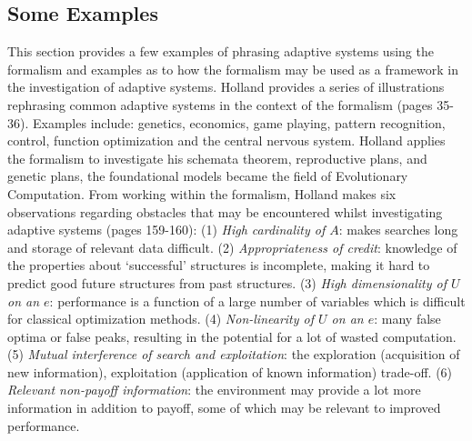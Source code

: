 \documentclass[a4paper, 11pt]{article}
\begin{document}
\subsection{Some Examples}
This section provides a few examples of phrasing adaptive systems using the formalism and examples as to how the formalism may be used as a framework in the investigation of adaptive systems. Holland provides a series of illustrations rephrasing common adaptive systems in the context of the formalism \cite{Holland1975} (pages 35-36). Examples include: genetics, economics, game playing, pattern recognition, control, function optimization and the central nervous system. Holland applies the formalism to investigate his schemata theorem, reproductive plans, and genetic plans, the foundational models became the field of Evolutionary Computation. From working within the formalism, Holland makes six observations regarding obstacles that may be encountered whilst investigating adaptive systems \cite{Holland1975} (pages 159-160): (1) \emph{High cardinality of $A$}: makes searches long and storage of relevant data difficult. (2) \emph{Appropriateness of credit}: knowledge of the properties about `successful' structures is incomplete, making it hard to predict good future structures from past structures. (3) \emph{High dimensionality of $U$ on an $e$}: performance is a function of a large number of variables which is difficult for classical optimization methods. (4) \emph{Non-linearity of $U$ on an $e$}: many false optima or false peaks, resulting in the potential for a lot of wasted computation. (5) \emph{Mutual interference of search and exploitation}: the exploration (acquisition of new information), exploitation (application of known information) trade-off. (6) \emph{Relevant non-payoff information}: the environment may provide a lot more information in addition to payoff, some of which may be relevant to improved performance.
\end{document}
